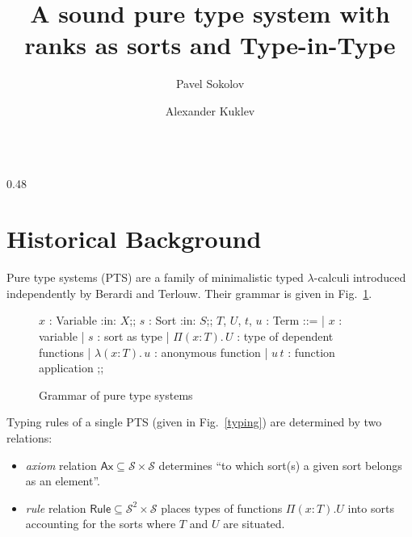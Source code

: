 \documentclass[final]{beamer}
\title[]{\bf \huge A sound pure type system with ranks
as sorts and Type-in-Type}
\author{
    Pavel Sokolov\inst{1} \and
    Alexander Kuklev\inst{2}
}
\institute{
    \inst{1} HSE University, Moscow \\
    \inst{2} Radboud University, Nijmegen
}
\theoremstyle{remark}
\begin{document}
\begin{frame}[t]
\begin{columns}[t]
\begin{column}{0.48\textwidth}
    \section{Historical Background}

    Pure type systems (PTS) are a family of minimalistic
    typed $\lambda$-calculi introduced independently by
    Berardi and Terlouw. Their grammar is given in
    Fig.~\ref{grammar}.
    \begin{figure}[ht]
        \begin{bnf}
            $x$ : \textsf{Variable} :in: $X$;;
            $s$ : \textsf{Sort} :in: $S$;;
            $T$, $U$, $t$, $u$ : \textsf{Term} ::=
            | $x$ : variable
            | $s$ : sort as type
            | $\Pi(x\colon T).\,U$
            : type of dependent functions
            | $\lambda(x\colon T).\,u$
            : anonymous function
            | $u\,t$ : function application
            ;;
        \end{bnf}
        \caption{Grammar of pure type systems}
        \label{grammar}
    \end{figure}
    Typing rules of a single PTS (given in
    Fig.~\ref{typing}) are determined by two relations:
    \begin{itemize}
        \item \textit{axiom} relation $\mathsf{Ax}
            \subseteq\mathcal{S}\times\mathcal{S}$
            determines ``to which sort(s) a given sort
            belongs as an element''.
        \item \textit{rule} relation $\mathsf{Rule}
            \subseteq\mathcal{S}^2\times\mathcal{S}$
            places types of functions $\Pi(x:T).U$ into
            sorts accounting for the sorts where $T$ and
            $U$ are situated.
    \end{itemize}
    \begin{figure}[ht]
\end{figure}
\end{column}
\end{columns}
\end{frame}
\end{document}
